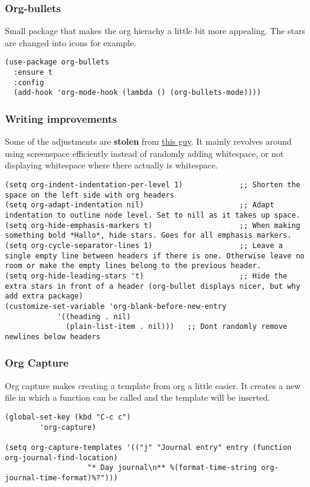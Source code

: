 \documentclass[11pt]{article}
\begin{document}
\subsubsection{Org-bullets}
\label{sec:orgb69399c}
Small package that makes the org hierachy a little bit more appealing. The stars are changed into icons for example.
\begin{verbatim}
(use-package org-bullets
  :ensure t
  :config
  (add-hook 'org-mode-hook (lambda () (org-bullets-mode))))
\end{verbatim}
\subsubsection{Writing improvements}
\label{sec:org3cf3f93}
Some of the adjustments are \textbf{stolen} from \href{https://explog.in/notes/writingsetup.html}{this guy}. It mainly revolves around using screenspace efficiently instead of randomly adding whitespace, or not displaying whitespace where there actually is whitespace.
\begin{verbatim}
(setq org-indent-indentation-per-level 1)             ;; Shorten the space on the left side with org headers
(setq org-adapt-indentation nil)                      ;; Adapt indentation to outline node level. Set to nill as it takes up space.
(setq org-hide-emphasis-markers t)                    ;; When making something bold *Hallo*, hide stars. Goes for all emphasis markers.
(setq org-cycle-separator-lines 1)                    ;; Leave a single empty line between headers if there is one. Otherwise leave no room or make the empty lines belong to the previous header.
(setq org-hide-leading-stars 't)                      ;; Hide the extra stars in front of a header (org-bullet displays nicer, but why add extra package)
(customize-set-variable 'org-blank-before-new-entry 
			'((heading . nil)
			  (plain-list-item . nil)))   ;; Dont randomly remove newlines below headers
\end{verbatim}
\subsubsection{Org Capture}
\label{sec:org83e0ee3}
Org capture makes creating a template from org a little easier. It creates a new file in which a function can be called and the template will be inserted.
\begin{verbatim}
(global-set-key (kbd "C-c c")
		'org-capture)

(setq org-capture-templates '(("j" "Journal entry" entry (function org-journal-find-location)
			       "* Day journal\n** %(format-time-string org-journal-time-format)%?")))
\end{verbatim}
\end{document}
